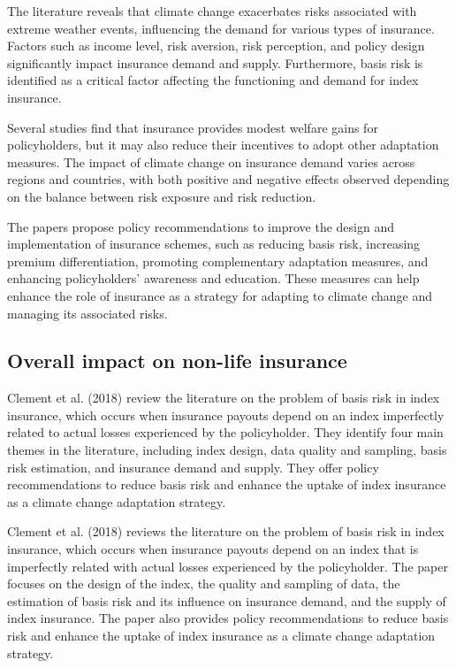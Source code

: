 \documentclass[a4paper,12pt]{article}
\begin{document}
The literature reveals that climate change exacerbates risks associated with extreme weather events, influencing the demand for various types of insurance. Factors such as income level, risk aversion, risk perception, and policy design significantly impact insurance demand and supply. Furthermore, basis risk is identified as a critical factor affecting the functioning and demand for index insurance.

Several studies find that insurance provides modest welfare gains for policyholders, but it may also reduce their incentives to adopt other adaptation measures. The impact of climate change on insurance demand varies across regions and countries, with both positive and negative effects observed depending on the balance between risk exposure and risk reduction.

The papers propose policy recommendations to improve the design and implementation of insurance schemes, such as reducing basis risk, increasing premium differentiation, promoting complementary adaptation measures, and enhancing policyholders' awareness and education. These measures can help enhance the role of insurance as a strategy for adapting to climate change and managing its associated risks.
\subsection{Overall impact on non-life insurance}
Clement et al. (2018) review the literature on the problem of basis risk in index insurance, which occurs when insurance payouts depend on an index imperfectly related to actual losses experienced by the policyholder. They identify four main themes in the literature, including index design, data quality and sampling, basis risk estimation, and insurance demand and supply. They offer policy recommendations to reduce basis risk and enhance the uptake of index insurance as a climate change adaptation strategy.

Clement et al. (2018) reviews the literature on the problem of basis risk in index insurance, which occurs when insurance payouts depend on an index that is imperfectly related with actual losses experienced by the policyholder. The paper focuses on the design of the index, the quality and sampling of data, the estimation of basis risk and its influence on insurance demand, and the supply of index insurance. The paper also provides policy recommendations to reduce basis risk and enhance the uptake of index insurance as a climate change adaptation strategy.
\end{document}
